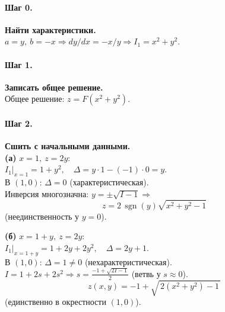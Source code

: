 \paragraph{Шаг 0.} \textbf{Найти характеристики.}\\
\(a=y,\ b=-x\Rightarrow dy/dx=-x/y\Rightarrow I_1=x^2+y^2\).

\paragraph{Шаг 1.} \textbf{Записать общее решение.}\\
Общее решение: \(z=F(x^2+y^2)\).

\paragraph{Шаг 2.} \textbf{Сшить с начальными данными.}\\
\textbf{(а) }\(x=1,\ z=2y\):\\
\(I_1|_{x=1}=1+y^2,\quad \Delta=y\cdot1-(-1)\cdot0=y\).\\
В \((1,0)\): \(\Delta=0\) (характеристическая).\\
Инверсия многозначна: \(y=\pm\sqrt{I-1}\Rightarrow\)
\[
\boxed{\,z=2\,\operatorname{sgn}(y)\sqrt{x^2+y^2-1}\,}
\]
(неединственность у \(y=0\)).

\textbf{(б) }\(x=1+y,\ z=2y\):\\
\(I_1|_{x=1+y}=1+2y+2y^2,\quad \Delta=2y+1\).\\
В \((1,0)\): \(\Delta=1\neq0\) (нехарактеристическая).\\
\(I=1+2s+2s^2\Rightarrow s=\frac{-1+\sqrt{2I-1}}{2}\) (ветвь у \(s\approx0\)).
\[
\boxed{\,z(x,y)=-1+\sqrt{\,2(x^2+y^2)-1\,}\,}
\]
(единственно в окрестности \((1,0)\)).

